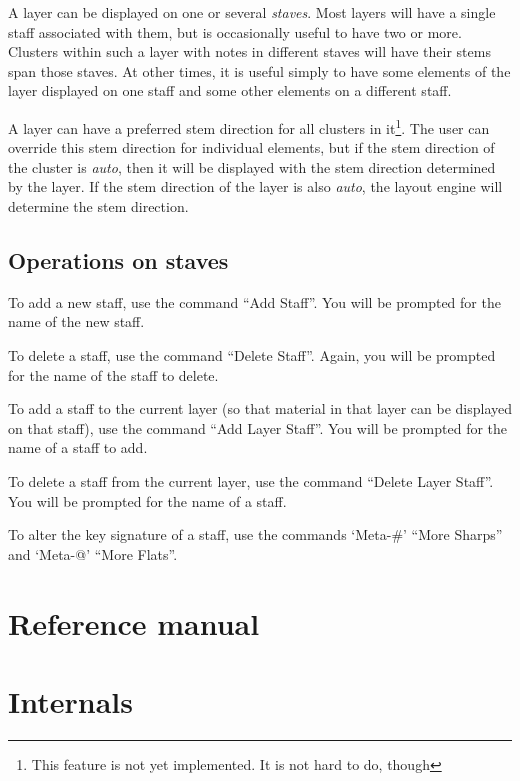 \documentclass[11pt]{book}
\def\unimp#1{\footnote{This feature is not yet implemented.  #1}}
\def\kbd#1{`#1'}
\def\command#1{``#1''}
\def\inputtex#1{}
\begin{document}
A layer can be displayed on one or several \emph{staves}.  Most layers
will have a single staff associated with them, but is occasionally
useful to have two or more.  Clusters within such a layer with notes
in different staves will have their stems span those staves.  At other
times, it is useful simply to have some elements of the layer
displayed on one staff and some other elements on a different
staff.

A layer can have a preferred stem direction for all clusters in
it\unimp{It is not hard to do, though}.  The user can override this
stem direction for individual elements, but if the stem direction of
the cluster is \emph{auto}, then it will
be displayed with the stem direction determined by the layer.  If the
stem direction of the layer is also \emph{auto}, the layout engine
will determine the stem direction. 

\chapter{Operations on staves}

To add a new staff, use the command \command{Add Staff}.  You will be prompted
for the name of the new staff.

To delete a staff, use the command \command{Delete Staff}.  Again, you
will be prompted for the name of the staff to delete.

To add a staff to the current layer (so that material in that layer
can be displayed on that staff), use the command \command{Add Layer
  Staff}.  You will be prompted for the name of a staff to add.

To delete a staff from the current layer, use the command
\command{Delete Layer Staff}.  You will be prompted for the name of a
staff. 

To alter the key signature of a staff, use the commands \kbd{Meta-\#}
\command{More Sharps} and \kbd{Meta-@} \command{More Flats}. 

\part{Reference manual}
\inputtex{model.tex}
\inputtex{commands.tex}

\part{Internals}
\end{document}
